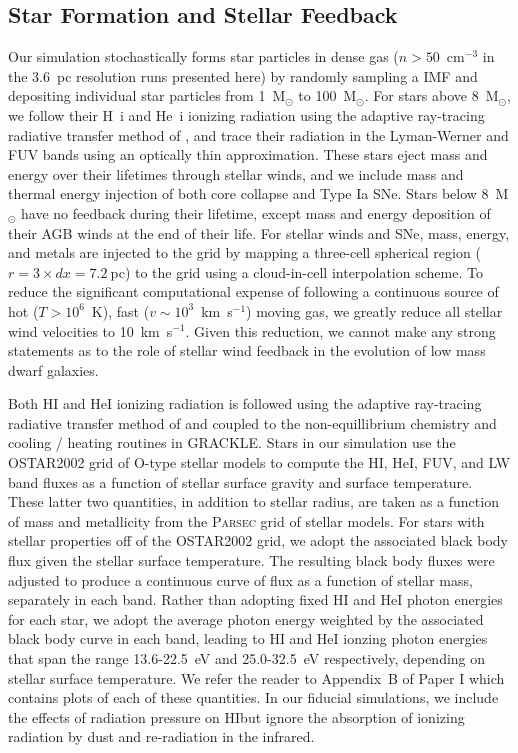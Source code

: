 \documentclass[twocolumn]{aastex62}
\newcommand{\HI}{HI}
\begin{document}
\subsection{Star Formation and Stellar Feedback}
\label{sec:sf feedback}

Our simulation stochastically forms star particles in dense gas ($n > 50$~cm$^{-3}$ in the 3.6~pc resolution runs presented here) by randomly sampling a \cite{Salpeter1955} IMF and depositing individual star particles from 1~M$_{\odot}$ to 100~M$_{\odot}$. For stars above 8~M$_{\odot}$, we follow their H~{\sc i} and He~{\sc i} ionizing radiation using the adaptive ray-tracing radiative transfer method of \cite{WiseAbel2011}, and trace their radiation in the Lyman-Werner and FUV bands using an optically thin approximation. These stars eject mass and energy over their lifetimes through stellar winds, and we include mass and thermal energy injection of both core collapse and Type Ia SNe. Stars below 8~M$_{\odot}$ have no feedback during their lifetime, except mass and energy deposition of their AGB winds at the end of their life. For stellar winds and SNe, mass, energy, and metals are injected to the grid by mapping a three-cell spherical region ($r=3 \times dx = 7.2~$pc) to the grid using a cloud-in-cell interpolation scheme. To reduce the significant computational expense of following a continuous source of hot ($T > 10^6$~K), fast ($v \sim 10^{3}$~km~s$^{-1}$) moving gas, we greatly reduce all stellar wind velocities to 10~km~s$^{-1}$. Given this reduction, we cannot make any strong statements as to the role of stellar wind feedback in the evolution of low mass dwarf galaxies. 

Both HI and HeI ionizing radiation is followed using the adaptive ray-tracing radiative transfer method of \cite{WiseAbel2011} and coupled to the non-equillibrium chemistry and cooling / heating routines in \textsc{GRACKLE}. Stars in our simulation use the \textsc{OSTAR2002} \citep{Lanz2003} grid of O-type stellar models to compute the HI, HeI, FUV, and LW band fluxes as a function of stellar surface gravity and surface temperature. These latter two quantities, in addition to stellar radius, are taken as a function of mass and metallicity from the \textsc{Parsec} \citep{Bressan2012,Tang2014} grid of stellar models. For stars with stellar properties off of the \textsc{OSTAR2002} grid, we adopt the associated black body flux given the stellar surface temperature. The resulting black body fluxes were adjusted to produce a continuous curve of flux as a function of stellar mass, separately in each band. Rather than adopting fixed HI and HeI photon energies for each star, we adopt the average photon energy weighted by the associated black body curve in each band, leading to HI and HeI ionzing photon energies that span the range 13.6-22.5~eV and 25.0-32.5~eV respectively, depending on stellar surface temperature. We refer the reader to Appendix~B of Paper I which contains plots of each of these quantities. In our fiducial simulations, we include the effects of radiation pressure on \HI but ignore the absorption of ionizing radiation by dust and re-radiation in the infrared.
\end{document}

